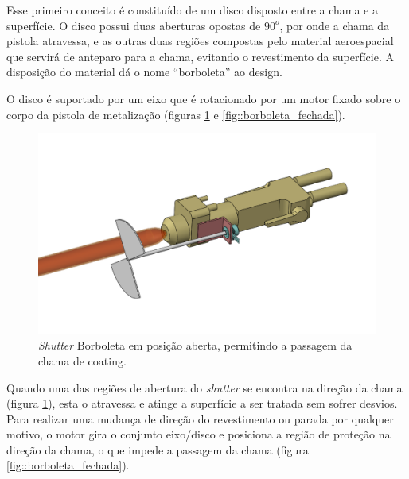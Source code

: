 Esse primeiro conceito é constituído de um disco disposto entre a chama e a
superfície. O disco possui duas aberturas opostas de $90^o$, por onde a chama da
pistola atravessa, e as outras duas regiões compostas pelo material
aeroespacial que servirá de anteparo para a chama, evitando o
revestimento da superfície. A disposição do material dá o nome
``borboleta'' ao design.

O disco é suportado por um eixo que é rotacionado por um motor fixado sobre o
corpo da pistola de metalização (figuras \ref{fig::borboleta_aberta} e
\ref{fig::borboleta_fechada}).

\begin{figure}[h!]
\centering
	\includegraphics[width=\columnwidth]{figs/estudo/shutter/Shutter_Borboleta_Aberto}
	\caption{\textit{Shutter} Borboleta em posição aberta, permitindo a passagem da chama
	de coating.}
	\label{fig::borboleta_aberta}
\end{figure}

Quando uma das regiões de abertura do \textit{shutter} se encontra na direção da
chama (figura \ref{fig::borboleta_aberta}), esta o atravessa e atinge a
superfície a ser tratada sem sofrer desvios. Para realizar uma mudança de
direção do revestimento ou parada por qualquer motivo, o motor gira o conjunto
eixo/disco e posiciona a região de proteção na direção da chama, o que impede a passagem da
chama (figura \ref{fig::borboleta_fechada}).

